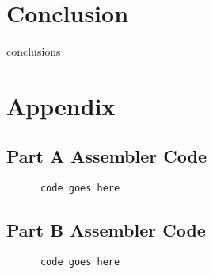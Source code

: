 \documentclass[letterpaper]{article}
\begin{document}
\section{Conclusion}
  conclusions

\section{Appendix}
  \subsection{Part A Assembler Code}

    \begin{lstlisting}
      code goes here
    \end{lstlisting}



  \subsection{Part B Assembler Code}
    \begin{lstlisting}
      code goes here
    \end{lstlisting}
\end{document}
